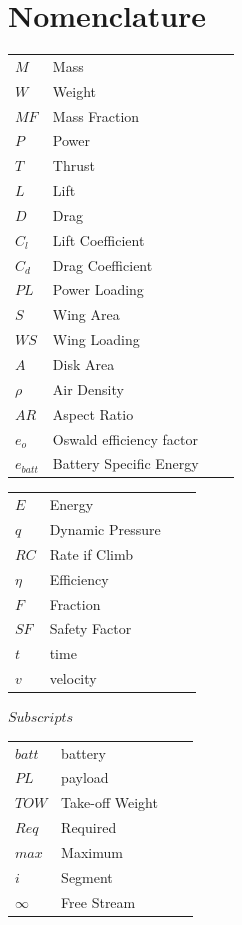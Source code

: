 \section*{Nomenclature}
\begin{minipage}{.5\textwidth}
\noindent\begin{longtable*}{@{}l @{\quad=\quad} l@{} @{}l @{\quad=\quad} l@{}}
$M$  & Mass \\
$W$  & Weight \\
$MF$   & Mass Fraction \\
$P$ & Power \\
$T$ & Thrust \\
$L$ & Lift \\
$D$ & Drag \\
$C_l$ & Lift Coefficient \\
$C_d$ & Drag Coefficient \\
$PL$ & Power Loading \\
$S$ & Wing Area \\
$WS$ & Wing Loading \\
$A$ & Disk Area \\
$\rho$ & Air Density \\
$AR$ & Aspect Ratio \\
$e_o$ & Oswald efficiency factor\\
$e_{batt}$ & Battery Specific Energy\\

\end{longtable*}%
\end{minipage}
\begin{minipage}{.5\textwidth}
\noindent\begin{longtable*}{@{}l @{\quad=\quad} l@{} @{}l @{\quad=\quad} l@{}}
$E$ & Energy \\
$q$ & Dynamic Pressure \\
$RC$ & Rate if Climb \\
$\eta$ & Efficiency\\
$F$ & Fraction\\
$SF$ & Safety Factor\\
$t$ & time \\
$v$ & velocity \\
\end{longtable*}%
$Subscripts$  \\
\noindent\begin{longtable*}{@{}l @{\quad=\quad} l@{} @{}l @{\quad=\quad} l@{}}
$batt$ & battery \\
$PL$ & payload \\
$TOW$ & Take-off Weight \\
$Req$ & Required \\
$max$ & Maximum \\
$i$ & Segment \\
$\infty$ & Free Stream \\
\end{longtable*}%
\end{minipage}


